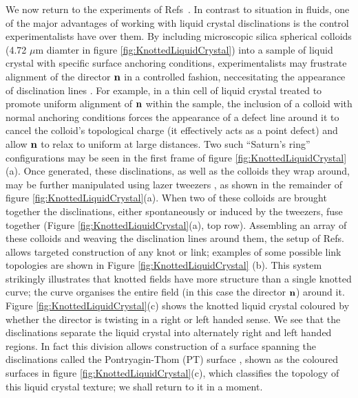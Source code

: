 We now return to the experiments of Refs~\citep{Tkalec2011,Tasinkevych2014,Copar2015}. In contrast to situation in fluids, one of the major advantages of working with liquid crystal disclinations is the control experimentalists have over them. By including microscopic silica spherical colloids (4.72 $\mu$m diamter in figure \ref{fig:KnottedLiquidCrystal}) into a sample of liquid crystal with specific surface anchoring conditions, experimentalists may frustrate alignment of the director $\bf n$ in a controlled fashion, neccesitating the appearance of disclination lines \cite{}. For example, in a thin cell of liquid crystal treated to promote uniform alignment of $\bf n$ within the sample, the inclusion of a colloid with normal anchoring conditions forces the appearance of a defect line around it to cancel the colloid's topological charge (it effectively acts as a point defect) and allow $\bf n$ to relax to uniform at large distances. Two such ``Saturn's ring'' configurations may be seen in the first frame of figure \ref{fig:KnottedLiquidCrystal}(a). Once generated, these disclinations, as well as the colloids they wrap around, may be further manipulated using lazer tweezers \citep{Tkalec2011}, as shown in the remainder of figure \ref{fig:KnottedLiquidCrystal}(a). When two of these colloids are brought together the disclinations, either spontaneously or induced by the tweezers, fuse together (Figure \ref{fig:KnottedLiquidCrystal}(a), top row). Assembling an array of these colloids and weaving the disclination lines around them, the setup of Refs.~\citep{Tkalec2011,Tasinkevych2014,Copar2015} allows targeted construction of any knot or link; examples of some possible link topologies are shown in Figure \ref{fig:KnottedLiquidCrystal} (b). This system strikingly illustrates that knotted fields have more structure than a single knotted curve; the curve organises the entire field (in this case the director $\bf n$) around it. Figure \ref{fig:KnottedLiquidCrystal}(c) shows the knotted liquid crystal coloured by whether the director is twisting in a right or left handed sense. We see that the disclinations separate the liquid crystal into alternately right and left handed regions. In fact this division allows construction of a surface spanning the disclinations called the Pontryagin-Thom (PT) surface \citep{Chen2013,ChenThesis}, shown as the coloured surfaces in figure \ref{fig:KnottedLiquidCrystal}(c), which classifies the topology of this liquid crystal texture; we shall return to it in a moment.

